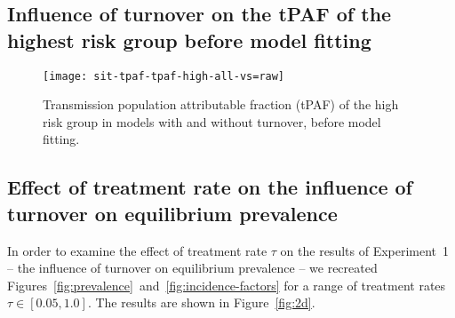 \subsection{Influence of turnover on the tPAF of the highest risk group before model fitting}
\begin{figure}[H]
  \centerline{\texttt{[image: sit-tpaf-tpaf-high-all-vs=raw]}}
  \caption{Transmission population attributable fraction (tPAF)
    of the high risk group in models with and without turnover,
    before model fitting.}
  \label{fig:tpaf-raw}
\end{figure}
\subsection{Effect of treatment rate on the influence of turnover on equilibrium prevalence}
In order to examine the effect of treatment rate $\tau$ on
the results of Experiment~1
-- the influence of turnover on equilibrium prevalence --
we recreated Figures~\ref{fig:prevalence}~and~\ref{fig:incidence-factors}
for a range of treatment rates $\tau \in [0.05, 1.0]$.
The results are shown in Figure~\ref{fig:2d}.
